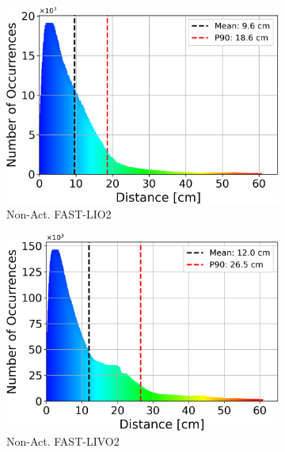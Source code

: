 \documentclass[a4paper, conference]{IEEEtran}
\begin{document}
\begin{figure}
\begin{subfigure}{0.19\textwidth}
    \centering
    \includegraphics[width=\textwidth]{pics/histogram_results/histogram_cond_non_actuated_lio.png}
    \caption{Non-Act. FAST-LIO2}
    \label{fig:hist_non_lio}
\end{subfigure}
\hfill
\begin{subfigure}{0.19\textwidth}
    \centering
    \includegraphics[width=\textwidth]{pics/histogram_results/histogram_cond_non_actuated_livo.png}
    \caption{Non-Act. FAST-LIVO2}
    \label{fig:hist_non_livo}
\end{subfigure}
\hfill
\begin{subfigure}{0.19\textwidth}
    \centering

\end{subfigure}
\end{figure}
\end{document}
